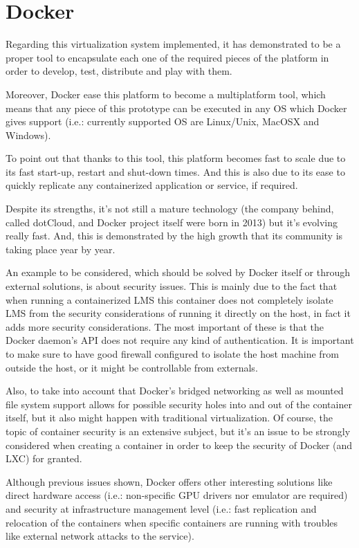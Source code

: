 \section{Docker}

Regarding this virtualization system implemented, it has demonstrated to be a proper tool to encapsulate each one of the required pieces of the platform in order to develop, test, distribute and play with them.

Moreover, Docker ease this platform to become a multiplatform tool, which means that any piece of this prototype can be executed in any OS which Docker gives support (i.e.: currently supported OS are Linux/Unix, MacOSX and Windows).

To point out that thanks to this tool, this platform becomes fast to scale due to its fast start-up, restart and shut-down times. And this is also due to its ease to quickly replicate any containerized application or service, if required. 

Despite its strengths, it's not still a mature technology (the company behind, called dotCloud, and Docker project itself were born in 2013) but it's evolving really fast. And, this is demonstrated by the high growth that its community is taking place year by year. 

An example to be considered, which should be solved by Docker itself or through external solutions, is about security issues. This is mainly due to the fact that when running a containerized LMS this container does not completely isolate LMS from the security considerations of running it directly on the host, in fact it adds more security considerations. The most important of these is that the Docker daemon's API does not require any kind of authentication. It is important to make sure to have good firewall configured to isolate the host machine from outside the host, or it might be controllable from externals. 

Also, to take into account that Docker's bridged networking as well as mounted file system support allows for possible security holes into and out of the container itself, but it also might happen with traditional virtualization. Of course, the topic of container security is an extensive subject, but it's an issue to be strongly considered when creating a container in order to keep the security of Docker (and LXC) for granted.

Although previous issues shown, Docker offers other interesting solutions like direct hardware access (i.e.: non-specific GPU drivers nor emulator are required) and security at infrastructure management level (i.e.: fast replication and relocation of the containers when specific containers are running with troubles like external network attacks to the service). 

